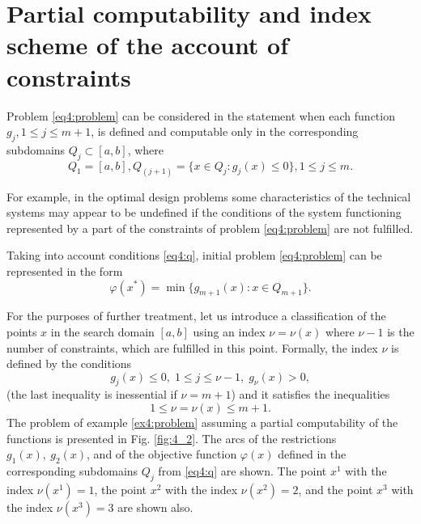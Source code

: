 \section{Partial computability and index scheme of the account of constraints}
Problem \eqref{eq4:problem} can be considered in the statement when each function $g_j,1\le j\le m+1$, is defined and computable only in the corresponding subdomains $Q_j\subset [a,b]$, where
\begin{equation}
  \label{eq4:q}
  Q_1=[a,b],Q_(j+1)=\{x\in Q_j:g_j(x)\le 0\},1\le j\le m.
\end{equation}

For example, in the optimal design problems some characteristics of the technical systems may appear to be undefined if the conditions of the system functioning represented by a part of the constraints of problem \eqref{eq4:problem} are not fulfilled.

Taking into account conditions \eqref{eq4:q}, initial problem \eqref{eq4:problem} can be represented in the form
\begin{equation}
  \label{eq4:problem2}
  \varphi(x^*)=\min\{g_{m+1}(x):x\in Q_{m+1}\}.
\end{equation}

For the purposes of further treatment, let us introduce a classification of the points $x$ in the search domain $[a,b]$ using an index $\nu=\nu(x)$ where $\nu-1$ is the number of constraints, which are fulfilled in this point. Formally, the index $\nu$ is defined by the conditions
\begin{equation}
  \label{eq4:condition}
  g_j(x)\le 0,\; 1\le j \le \nu-1,\; g_\nu(x)>0,
\end{equation}
(the last inequality is inessential  if $\nu=m+1$) and it satisfies the inequalities
\begin{displaymath}
  1\le\nu=\nu(x)\le m+1.
\end{displaymath}
The problem of example \ref{ex4:problem} assuming a partial computability of the functions is presented in Fig. \ref{fig:4_2}. The arcs of the restrictions $g_1(x),\:g_2(x)$, and of the objective function $\varphi(x)$ defined in the corresponding subdomains $Q_j$ from \eqref{eq4:q} are shown. The point $x^1$ with the index $\nu(x^1)=1$, the point $x^2$ with the index $\nu(x^2)=2$, and the point $x^3$ with the index $\nu(x^3)=3$ are shown also.

